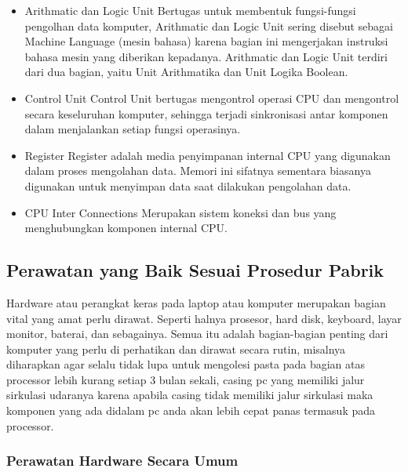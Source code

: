\begin{itemize}
	\item Arithmatic dan Logic Unit
	Bertugas untuk membentuk fungsi-fungsi pengolhan data komputer, Arithmatic dan Logic Unit sering disebut sebagai Machine Language
	(mesin bahasa) karena bagian ini mengerjakan instruksi bahasa mesin yang diberikan kepadanya. Arithmatic dan Logic Unit terdiri
	dari dua bagian, yaitu Unit Arithmatika dan Unit Logika Boolean.
	\item Control Unit
	Control Unit bertugas mengontrol operasi CPU dan mengontrol secara keseluruhan komputer, sehingga terjadi sinkronisasi antar komponen
	dalam menjalankan setiap fungsi operasinya.
	\item Register
	Register adalah media penyimpanan internal CPU yang digunakan dalam proses mengolahan data. Memori ini sifatnya sementara biasanya
	digunakan untuk menyimpan data saat dilakukan pengolahan data.
	\item CPU Inter Connections
	Merupakan sistem koneksi dan bus yang menghubungkan komponen internal CPU.
\end{itemize}

\subsection{Perawatan yang Baik Sesuai Prosedur Pabrik}
Hardware atau perangkat keras pada laptop atau komputer merupakan bagian vital yang amat perlu dirawat. 
Seperti halnya prosesor, hard disk, keyboard, layar monitor, baterai, dan sebagainya. 
Semua itu adalah bagian-bagian penting dari komputer yang perlu di perhatikan dan dirawat secara rutin, misalnya
diharapkan agar selalu tidak lupa untuk mengolesi pasta pada bagian atas processor lebih kurang setiap 3 bulan sekali,
casing pc yang memiliki jalur sirkulasi udaranya karena apabila casing tidak memiliki jalur sirkulasi maka komponen yang 
ada didalam pc anda akan lebih cepat panas termasuk pada processor. 


\subsubsection{Perawatan Hardware Secara Umum}

